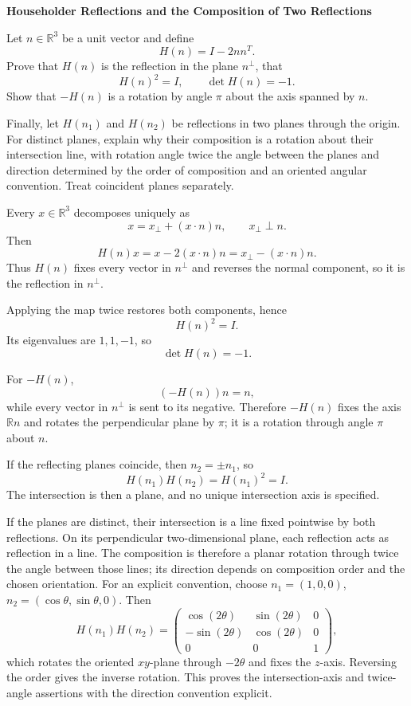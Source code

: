 \begin{problem}[CP-I-0006]
\label{prob:cp-i-0006}
\textbf{Householder Reflections and the Composition of Two Reflections}

\hspace*{1.5em}Let \(n\in\mathbb R^3\) be a unit vector and define
\[
H(n)=I-2nn^T.
\]
Prove that \(H(n)\) is the reflection in the plane \(n^\perp\), that
\[
H(n)^2=I,
\qquad
\det H(n)=-1.
\]
Show that \(-H(n)\) is a rotation by angle \(\pi\) about the axis spanned by \(n\).

Finally, let \(H(n_1)\) and \(H(n_2)\) be reflections in two planes through the origin.
For distinct planes, explain why their composition is a rotation about their intersection
line, with rotation angle twice the angle between the planes and direction determined
by the order of composition and an oriented angular convention. Treat coincident planes separately.
\end{problem}

\begin{solution}
Every \(x\in\mathbb R^3\) decomposes uniquely as
\[
x=x_\perp+(x\cdot n)n,
\qquad
x_\perp\perp n.
\]
Then
\[
H(n)x
=
x-2(x\cdot n)n
=
x_\perp-(x\cdot n)n.
\]
Thus \(H(n)\) fixes every vector in \(n^\perp\) and reverses the normal component, so it is the
reflection in \(n^\perp\).

Applying the map twice restores both components, hence
\[
H(n)^2=I.
\]
Its eigenvalues are \(1,1,-1\), so
\[
\det H(n)=-1.
\]

For \(-H(n)\),
\[
(-H(n))n=n,
\]
while every vector in \(n^\perp\) is sent to its negative. Therefore \(-H(n)\) fixes the axis
\(\mathbb R n\) and rotates the perpendicular plane by \(\pi\); it is a rotation through angle
\(\pi\) about \(n\).

If the reflecting planes coincide, then \(n_2=\pm n_1\), so
\[
H(n_1)H(n_2)=H(n_1)^2=I.
\]
The intersection is then a plane, and no unique intersection axis is specified.

If the planes are distinct, their intersection is a line fixed pointwise by both reflections.
On its perpendicular two-dimensional plane, each reflection acts as reflection in a line.
The composition is therefore a planar rotation through twice the angle between those lines;
its direction depends on composition order and the chosen orientation. For an explicit
convention, choose \(n_1=(1,0,0)\), \(n_2=(\cos\theta,\sin\theta,0)\). Then
\[
H(n_1)H(n_2)=
\begin{pmatrix}
\cos(2\theta)&\sin(2\theta)&0\\
-\sin(2\theta)&\cos(2\theta)&0\\
0&0&1
\end{pmatrix},
\]
which rotates the oriented \(xy\)-plane through \(-2\theta\) and fixes the \(z\)-axis.
Reversing the order gives the inverse rotation. This proves the intersection-axis and
twice-angle assertions with the direction convention explicit.
\end{solution}

